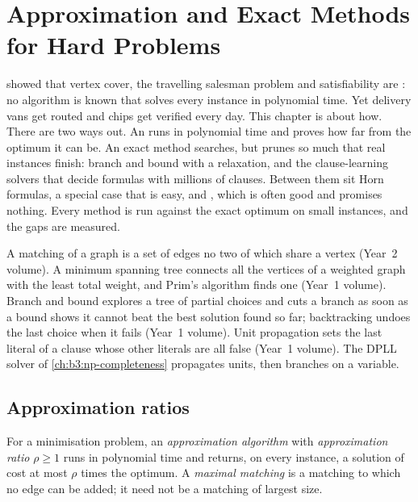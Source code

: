 \chapter{Approximation and Exact Methods for Hard Problems}\label{ch:b3:hard-problems}

 showed that vertex cover, the travelling salesman problem and satisfiability are : no algorithm is known that solves every instance in polynomial time. Yet delivery vans get routed and chips get verified every day. This chapter is about how. There are two ways out. An  runs in polynomial time and proves how far from the optimum it can be. An exact method searches, but prunes so much that real instances finish: branch and bound with a relaxation, and the clause-learning solvers that decide formulas with millions of clauses. Between them sit Horn formulas, a special case that is easy, and , which is often good and promises nothing. Every method is run against the exact optimum on small instances, and the gaps are measured.

\begin{recall}
A matching of a graph is a set of edges no two of which share a vertex (Year~2 volume). A minimum spanning tree connects all the vertices of a weighted graph with the least total weight, and Prim's algorithm finds one (Year~1 volume). Branch and bound explores a tree of partial choices and cuts a branch as soon as a bound shows it cannot beat the best solution found so far; backtracking undoes the last choice when it fails (Year~1 volume). Unit propagation sets the last literal of a clause whose other literals are all false (Year~1 volume). The DPLL solver  of \cref{ch:b3:np-completeness} propagates units, then branches on a variable.
\end{recall}

\section{Approximation ratios}\label{sec:b3:hard-problems:approximation}

\begin{definition}\label{def:b3:hard-problems:approximation}
For a minimisation problem, an \emph{approximation algorithm} with \emph{approximation ratio} $\rho \ge 1$ runs in polynomial time and returns, on every instance, a solution of cost at most $\rho$ times the optimum. A \emph{maximal matching} is a matching to which no edge can be added; it need not be a matching of largest size.
\end{definition}

